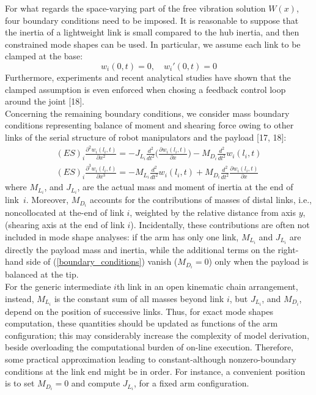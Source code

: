 \documentclass[a4paper,12pt,oneside]{report}
\begin{document}
For what regards the space-varying part of the free vibration solution $W(x)$, four boundary conditions need to be imposed. It is reasonable to suppose that the inertia of a lightweight link is small compared to the hub inertia, and then constrained mode shapes can be used. In particular, we assume each link to be clamped at the base:
\begin{equation}
  w_i(0,t)=0, \quad w_i'(0,t)=0
\end{equation} 
Furthermore, experiments and recent analytical studies have shown that the clamped assumption is even enforced when chosing a feedback control loop around the joint [18].\\
Concerning the remaining boundary conditions, we consider mass boundary conditions representing balance of moment and shearing force owing to other links of the serial structure of robot manipulators and the payload [17, 18]:
\begin{equation}
  \begin{array}{c}
  (ES)_i\frac{\partial^2w_i(l_i,t)}{\partial x^2}=-J_{L_i}\frac{d^2}{dt^2}\Big(\frac{\partial w_i(l_i,t)}{\partial x}\Big)-M_{D_i}\frac{d^2}{dt^2}w_i(l_i,t)\\
  (ES)_i\frac{\partial^3w_i(l_i,t)}{\partial x^3}=-M_{L_i}\frac{d^2}{dt^2}w_i(l_i,t)+M_{D_i}\frac{d^2}{dt^2}\frac{\partial w_i(l_i,t)}{\partial x}
  \end{array}
  \label{boundary_conditions}
\end{equation}
where $M_{L_i}$, and $J_{L_i}$, are the actual mass and moment of inertia at the end of link~$i$. Moreover, $M_{D_i}$ accounts for the contributions of masses of distal links, i.e., noncollocated at the-end of link $i$, weighted by the relative distance from axis $y$, (shearing axis at the end of link $i$). Incidentally, these contributions are often not included in mode shape analyses: if the arm has only one link, $M_{L_i}$  and $J_{L_i}$ are directly the payload mass and inertia, while the additional terms on the right-hand side of (\ref{boundary_conditions}) vanish ($M_{D_i}=0$) only when the payload is balanced at the tip.\\ 
For the generic intermediate $i$th link in an open kinematic chain arrangement, instead, $M_{L_i}$ is the constant sum of all masses beyond link $i$, but $J_{L_i}$, and $M_{D_i}$, depend on the position of successive links. Thus, for exact mode shapes computation, these quantities should be updated as functions of the arm configuration; this may considerably increase the complexity of model derivation, beside overloading the computational burden of on-line execution. Therefore, some practical approximation leading to constant-although nonzero-boundary conditions at the link end might be in order. For instance, a convenient position is to set $M_{D_i}=0$ and compute $J_{L_i}$, for a fixed arm configuration.\\
\end{document}
